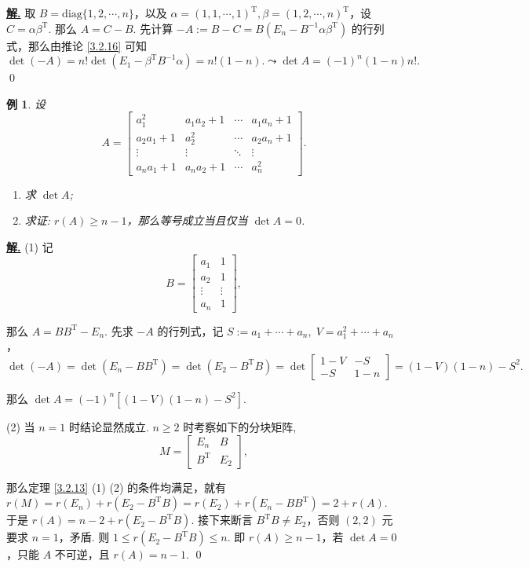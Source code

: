 \documentclass[10pt,openany]{article}
\theoremstyle{thmstyle} %
\theoremstyle{defstyle} %
\theoremstyle{prostyle} %
\theoremstyle{exastyle}
\newtheorem{example}[theorem]{例}
\theoremstyle{remstyle}
\newenvironment{solution}{\par\underline{\textbf{解.}} \;\fangsong}{\qed\par}
\newcommand{\T}{^{\text{T}}}
\newcommand{\diag}{\mathrm{diag}}
\begin{document}
\begin{solution}
	取 \( B=\diag\{1,2,\cdots,n\} \)，以及 \( \alpha=(1,1,\cdots,1)\T, \beta=(1,2,\cdots,n)\T \)，设 \( C=\alpha\beta\T \). 那么 \( A=C-B \). 先计算 \( -A:=B-C=B(E_n-B^{-1}\alpha\beta\T) \) 的行列式，那么由推论 \ref{3.2.16} 可知
	\[ \det(-A)= n! \det(E_1-\beta\T B^{-1}\alpha)=n! (1-n). \leadsto \det A=(-1)^{n}(1-n)n!. \]
\end{solution}


\begin{example} \label{3.2.19}
	设
	\[ A=\begin{bmatrix}
		a_1^2 & a_1 a_2 + 1 & \cdots & a_1 a_n + 1 \\
		a_2 a_1 + 1 & a_2^2 & \cdots & a_2 a_n + 1 \\
		\vdots & \vdots & \ddots & \vdots \\
		a_n a_1 + 1 & a_n a_2 + 1 & \cdots & a_n^2
	\end{bmatrix}. \]
	
	\begin{enumerate}[(1)]
		\item 求 \( \det A \);
		\item 求证: \( r(A) \geq n-1 \)，那么等号成立当且仅当 \( \det A=0 \). 
	\end{enumerate}
\end{example}


\begin{solution}
	(1) 记
	\[ B=\begin{bmatrix}
		a_1 & 1 \\ 
		a_2 & 1 \\
		\vdots & \vdots \\
		a_n & 1
	\end{bmatrix}, \]
	
	那么 \( A=BB\T-E_n \). 先求 \( -A \) 的行列式，记 \( S:=a_1+\cdots+a_n, \; V=a_1^2+\cdots+a_n \)，
	\[ \det (-A)= \det (E_n-BB\T)= \det(E_2-B\T B)= \det \begin{bmatrix}
		1-V & -S \\
		-S & 1-n
	\end{bmatrix}= (1-V)(1-n)-S^2. \]
	
	那么 \( \det A=(-1)^n[(1-V)(1-n)-S^2] \).
	
	\vspace{1ex}
	
	(2) 当 \( n=1 \) 时结论显然成立. \( n \geq 2 \) 时考察如下的分块矩阵,
	\[ M=\begin{bmatrix}
		E_n & B \\
		B\T & E_2
	\end{bmatrix}, \]
	
	那么定理 \ref{3.2.13} (1) (2) 的条件均满足，就有 \( r(M)= r(E_n)+r(E_2-B\T B)=r(E_2)+r(E_n-BB\T)=2+r(A) \). 于是 \( r(A)=n-2+r(E_2-B\T B) \). 接下来断言 \( B\T B \neq E_2 \)，否则 \( (2,2) \) 元要求 \( n=1 \)，矛盾. 则 \( 1 \leq r(E_2-B\T B) \leq n \). 即 \( r(A) \geq n-1 \)，若 \( \det A=0 \)，只能 \( A \) 不可逆，且 \( r(A)=n-1 \). 
\end{solution}
\end{document}
